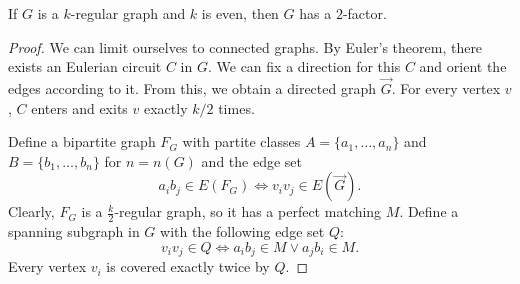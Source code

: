 \begin{theorem}
  If $G$ is a $k$-regular graph and $k$ is even, then $G$ has a $2$-factor.
\end{theorem}

\begin{proof}
  We can limit ourselves to connected graphs.
  By Euler's theorem, there exists an Eulerian circuit $C$ in $G$.
  We can fix a direction for this $C$ and orient the edges according to it.
  From this, we obtain a directed graph $\vec{G}$.
  For every vertex $v$, $C$ enters and exits $v$ exactly $k/2$ times.

  Define a bipartite graph $F_G$ with partite classes $A = \{a_1, \ldots, a_n\}$
  and $B = \{b_1, \ldots, b_n\}$ for $n = n(G)$ and the edge set
  \[
	a_i b_j \in E(F_G) \iff v_i v_j \in E(\vec{G}).
  \]
  Clearly, $F_G$ is a $\frac{k}{2}$-regular graph, so it has a perfect matching
  $M$.
  Define a spanning subgraph in $G$ with the following edge set $Q$:
  \[
	v_i v_j \in Q \iff a_i b_j \in M \lor a_j b_i \in M.
  \]
  Every vertex $v_i$ is covered exactly twice by $Q$.
\end{proof}

